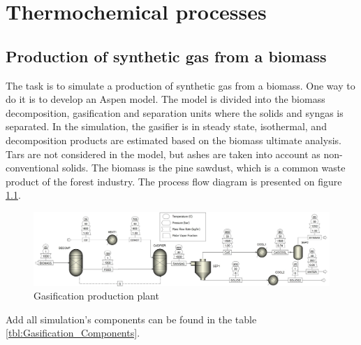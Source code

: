 \chapter{Thermochemical processes}

\section{Production of synthetic gas from a biomass}

The task is to simulate a production of synthetic gas from a biomass. One way to do it is to develop an Aspen model. The model is divided into the biomass decomposition, gasification and separation units where the solids and syngas is separated. In the simulation, the gasifier is in steady state, isothermal, and decomposition products are estimated based on the biomass ultimate analysis. Tars are not considered in the model, but ashes are taken into account as non-conventional solids. The biomass is the pine sawdust, which is a common waste product of the forest industry. The process flow diagram is presented on figure \ref{fig:Gasification}.

\begin{figure}[h!]
	\centering
	\includegraphics[width=\linewidth]{Figures/TchermochemicalProcesses/Gasification.jpeg}
	\caption{Gasification production plant}
	\label{fig:Gasification}
\end{figure}

Add all simulation's components can be found in the table \ref{tbl:Gasification_Components}.

